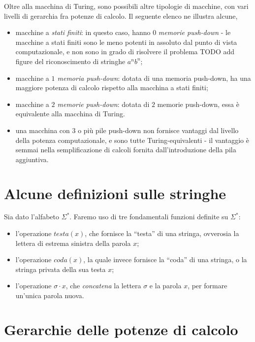 \documentclass[10pt]{book}
\begin{document}
Oltre alla macchina di Turing, sono possibili altre tipologie di macchine, con
vari livelli di gerarchia fra potenze di calcolo. Il seguente elenco ne
illustra alcune,

\begin{itemize}
    \item macchine a \emph{stati finiti}: in questo caso, hanno $0$
        \emph{memorie push-down} \-- le macchine a stati finiti sono le meno
        potenti in assoluto dal punto di vista computazionale, e non sono in
        grado di risolvere il problema TODO add figure del riconoscimento di
        stringhe $a^n b^n$;
    \item macchine a \emph{$1$ memoria push-down}: dotata di una memoria
        push-down, ha una maggiore potenza di calcolo rispetto alla macchina a
        stati finiti;
    \item macchine a \emph{$2$ memorie push-down}: dotata di $2$ memorie
        push-down, essa è equivalente alla macchina di Turing.
    \item una macchina con $3$ o più pile push-down non fornisce vantaggi dal
        livello della potenza computazionale, e sono tutte Turing-equivalenti
        \-- il vantaggio è semmai nella semplificazione di calcoli fornita
        dall'introduzione della pila aggiuntiva.
\end{itemize}


\section{Alcune definizioni sulle stringhe}

Sia dato l'alfabeto $\Sigma^*$. Faremo uso di tre fondamentali funzioni
definite su $\Sigma^*$:
\begin{itemize}
    \item l'operazione $testa(x)$, che fornisce la ``testa'' di una stringa,
        ovverosia la lettera di estrema sinistra della parola $x$;
    \item l'operazione $coda(x)$, la quale invece fornisce la ``coda'' di una
        stringa, o la stringa privata della sua testa $x$;
    \item l'operazione $\sigma \cdot x$, che \emph{concatena} la lettera
        $\sigma$ e la parola $x$, per formare un'unica parola nuova.
\end{itemize}


\section{Gerarchie delle potenze di calcolo}
\end{document}
